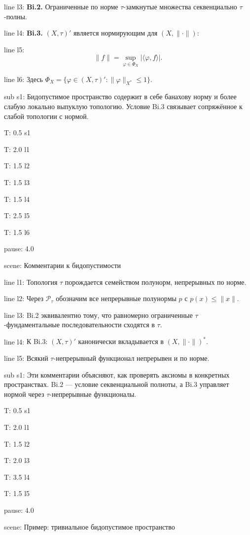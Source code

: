 \documentclass[a4paper,11pt]{article}
\let\ph\varphi
\begin{document}
line l3: {\textbf{Bi.2.} Ограниченные по норме $\tau$-замкнутые множества секвенциально $\tau$-полны.}

line l4: {\textbf{Bi.3.} $(X,\tau)'$ является нормирующим для $(X,\|\cdot\|)$:}

line l5: {$$\|f\|=\sup\limits_{\ph\in\Phi_X}|\langle\ph,f\rangle|.$$}

line l6: {Здесь $\Phi_X=\{\ph\in(X,\tau)' : \|\ph\|_{X^*}\le 1\}$.}


sub s1: {Бидопустимое пространство содержит в себе банахову норму и более слабую локально выпуклую топологию. Условие Bi.3 связывает сопряжённое к слабой топологии с нормой.}


T: 0.5 s1

T: 2.0 l1

T: 1.5 l2

T: 1.5 l3

T: 1.5 l4

T: 2.5 l5

T: 1.5 l6

pause: 4.0



scene: {Комментарии к бидопустимости}

line l1: {Топология $\tau$ порождается семейством полунорм, непрерывных по норме.}

line l2: {Через $\mathcal{P}_\tau$ обозначим все непрерывные полунормы $p$ с $p(x)\le\|x\|$.}

line l3: {Bi.2 эквивалентно тому, что равномерно ограниченные $\tau$-фундаментальные последовательности сходятся в $\tau$.}

line l4: {К Bi.3: $(X,\tau)'$ канонически вкладывается в $(X,\|\cdot\|)^*$.}

line l5: {Всякий $\tau$-непрерывный функционал непрерывен и по норме.}


sub s1: {Эти комментарии объясняют, как проверять аксиомы в конкретных пространствах. Bi.2 --- условие секвенциальной полноты, а Bi.3 управляет нормой через $\tau$-непрерывные функционалы.}


T: 0.5 s1

T: 2.0 l1

T: 1.5 l2

T: 2.0 l3

T: 3.5 l4

T: 1.5 l5

pause: 4.0



scene: {Пример: тривиальное бидопустимое пространство}
\end{document}
